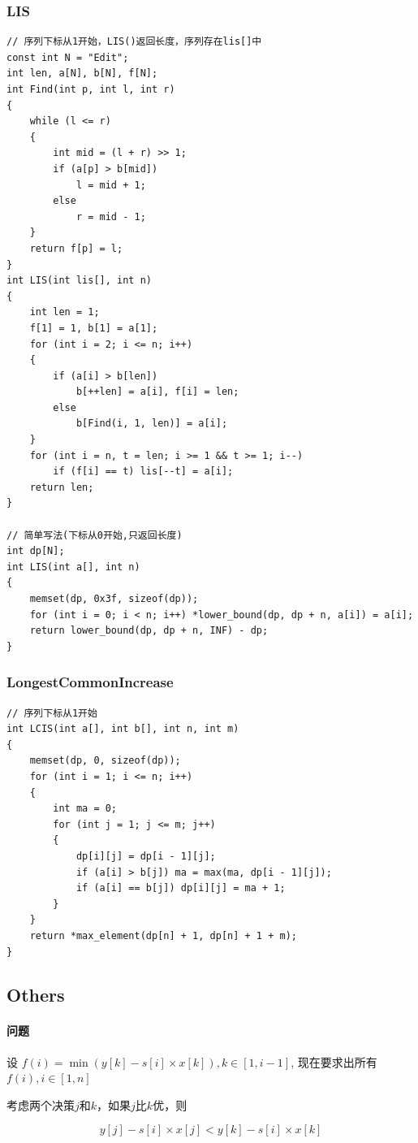\documentclass[twoside]{article}
\begin{document}
\subsubsection{LIS}
\begin{lstlisting}
// 序列下标从1开始，LIS()返回长度，序列存在lis[]中
const int N = "Edit";
int len, a[N], b[N], f[N];
int Find(int p, int l, int r)
{
    while (l <= r)
    {
        int mid = (l + r) >> 1;
        if (a[p] > b[mid])
            l = mid + 1;
        else
            r = mid - 1;
    }
    return f[p] = l;
}
int LIS(int lis[], int n)
{
    int len = 1;
    f[1] = 1, b[1] = a[1];
    for (int i = 2; i <= n; i++)
    {
        if (a[i] > b[len])
            b[++len] = a[i], f[i] = len;
        else
            b[Find(i, 1, len)] = a[i];
    }
    for (int i = n, t = len; i >= 1 && t >= 1; i--)
        if (f[i] == t) lis[--t] = a[i];
    return len;
}

// 简单写法(下标从0开始,只返回长度)
int dp[N];
int LIS(int a[], int n)
{
    memset(dp, 0x3f, sizeof(dp));
    for (int i = 0; i < n; i++) *lower_bound(dp, dp + n, a[i]) = a[i];
    return lower_bound(dp, dp + n, INF) - dp;
}\end{lstlisting}
\subsubsection{LongestCommonIncrease}
\begin{lstlisting}
// 序列下标从1开始
int LCIS(int a[], int b[], int n, int m)
{
    memset(dp, 0, sizeof(dp));
    for (int i = 1; i <= n; i++)
    {
        int ma = 0;
        for (int j = 1; j <= m; j++)
        {
            dp[i][j] = dp[i - 1][j];
            if (a[i] > b[j]) ma = max(ma, dp[i - 1][j]);
            if (a[i] == b[j]) dp[i][j] = ma + 1;
        }
    }
    return *max_element(dp[n] + 1, dp[n] + 1 + m);
}\end{lstlisting}
\subsection{Others}
\paragraph{问题}
设 $f(i) = \min(y[k] - s[i] \times x[k]), k \in [1,i-1]$, 现在要求出所有$f(i), i \in [1,n]$

考虑两个决策$j$和$k$，如果$j$比$k$优，则

$$y[j] - s[i] \times x[j] < y[k] - s[i] \times x[k]$$
\end{document}
